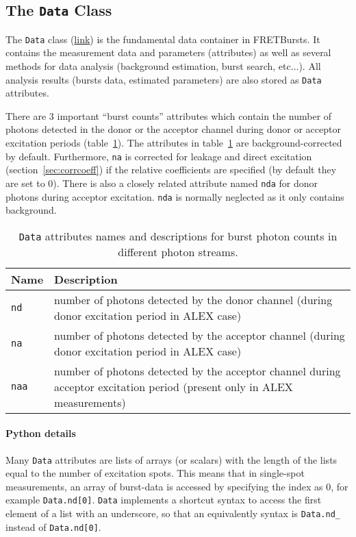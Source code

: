 
\subsection{The \texttt{Data} Class}
\label{sec:data_intro}

The \verb|Data| class
(\href{http://fretbursts.readthedocs.org/en/latest/data_class.html}{link})
is the fundamental data container in FRETBursts. It contains the
measurement data and parameters (attributes) as well as several methods
for data analysis (background estimation, burst search, etc...).
All analysis results (bursts data, estimated parameters) are also stored
as \verb|Data| attributes.

There are 3 important ``burst counts'' attributes which contain
the number of photons detected in the donor or the acceptor channel
during donor or acceptor excitation periods (table~\ref{tab:data_n}).
The attributes in table~\ref{tab:data_n} are background-corrected by default.
Furthermore, \verb|na| is corrected for leakage and direct excitation
(section~\ref{sec:corrcoeff}) if the relative coefficients are specified
(by default they are set to 0).
There is also a closely related attribute named \verb|nda| for donor photons
during acceptor excitation. \verb|nda| is normally neglected as it only contains
background.

\begin{table}
\begin{tabular}{l p{}}
  Name  & Description \\
  \hline
  \verb|nd| & number of photons detected by the donor channel (during donor excitation period in ALEX case)\\
  \verb|na| & number of photons detected by the acceptor channel (during donor excitation period in ALEX case)\\
  \verb|naa| & number of photons detected by the acceptor channel during acceptor excitation period (present only in ALEX measurements)\\
\end{tabular}
\caption{\label{tab:data_n}\texttt{Data} attributes names and descriptions for burst photon counts in different photon streams.}
\end{table}


\paragraph{Python details}
Many \verb|Data| attributes are lists of arrays (or scalars) with the length of the lists
equal to the number of excitation spots. This means that in
single-spot measurements, an array of burst-data
is accessed by specifying the index as 0, for example \verb|Data.nd[0]|.
\verb|Data| implements a shortcut syntax to access the first element of a list
with an underscore, so that an equivalently syntax is
\verb|Data.nd_| instead of \verb|Data.nd[0]|.


